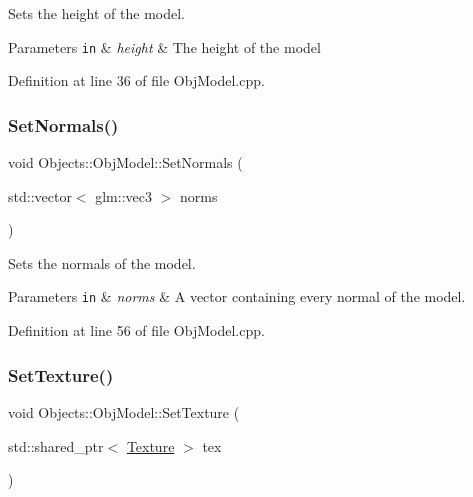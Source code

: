 Sets the height of the model. 
\begin{DoxyParams}[1]{Parameters}
\mbox{\tt in}  & {\em height} & The height of the model \\
\hline
\end{DoxyParams}


Definition at line 36 of file Obj\+Model.\+cpp.

\mbox{\label{class_objects_1_1_obj_model_aaa85b89c8fd001ad528a733483e1e7c9}} 
\subsubsection{\texorpdfstring{Set\+Normals()}{SetNormals()}}
{\footnotesize\ttfamily void Objects\+::\+Obj\+Model\+::\+Set\+Normals (\begin{DoxyParamCaption}\item[{std\+::vector$<$ glm\+::vec3 $>$}]{norms }\end{DoxyParamCaption})}

Sets the normals of the model. 
\begin{DoxyParams}[1]{Parameters}
\mbox{\tt in}  & {\em norms} & A vector containing every normal of the model. \\
\hline
\end{DoxyParams}


Definition at line 56 of file Obj\+Model.\+cpp.

\mbox{\label{class_objects_1_1_obj_model_a72ef59adfa1dd88840178aa76479e471}} 
\subsubsection{\texorpdfstring{Set\+Texture()}{SetTexture()}}
{\footnotesize\ttfamily void Objects\+::\+Obj\+Model\+::\+Set\+Texture (\begin{DoxyParamCaption}\item[{std\+::shared\+\_\+ptr$<$ \hyperlink{class_objects_1_1_texture}{Texture} $>$}]{tex }\end{DoxyParamCaption})}

